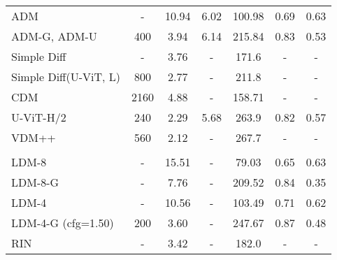 \begin{table}[t]
{\begin{tabular}{lcccccc}
ADM~\cite{beats_gan}    & -       & 10.94           & 6.02             & 100.98       & 0.69                & 0.63             \\
ADM-G, ADM-U               & 400     & 3.94            & 6.14             & 215.84       & 0.83                & 0.53             \\ \midrule
Simple Diff~\cite{hoogeboom2023simple}    & -    & 3.76            & -                & 171.6        & -                   & -                \\
Simple Diff(U-ViT, L) & 800       & 2.77            & -                & 211.8        & -                   & -                \\  \midrule

CDM~\cite{ho2022cascaded}                        & 2160   & 4.88            & -                & 158.71       & -                   & -                \\ 

U-ViT-H/2~\cite{uvit}                  & 240    & 2.29            & 5.68             & 263.9        & 0.82                & 0.57             \\ 
VDM++~\cite{kingma2024understanding}                      & 560    & 2.12            & -                & 267.7        & -                   & -                \\



\arrayrulecolor{black!100}\midrule
\multicolumn{7}{c}{\emph{Latent Diffusion Model}} \\ \arrayrulecolor{black!30}\midrule
LDM-8~\cite{rombach2022ldm}   & -       & 15.51           & -                & 79.03        & 0.65                & 0.63             \\
LDM-8-G                    & -       & 7.76            & -                & 209.52       & 0.84                & 0.35             \\
LDM-4                      & -    & 10.56           & -                & 103.49       & 0.71                & 0.62             \\
LDM-4-G (cfg=1.50)         & 200       & 3.60            & -                & 247.67       & 0.87                & 0.48             \\ \midrule
RIN~\cite{jabri2022scalable}                        & -       & 3.42            & -                & 182.0        & -                   & -                \\ 


\end{tabular}}
\end{table}
